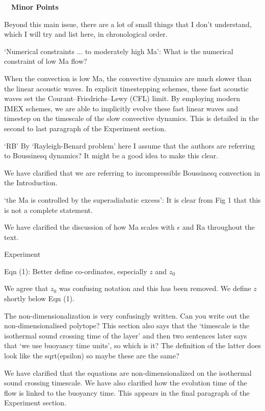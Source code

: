 \documentclass[aps, 11pt, singlecolumn]{revtex4-1} %
\begin{document}
\begin{singlespace}
$\,$
\newline
$\,$
\newline
\indent
\large{\textbf{Minor Points}}\newline
\begin{myquotation}
Beyond this main issue, there are a lot of small things that I don't
understand, which I will try and list here, in chronological order.

`Numerical constraints ... to moderately high Ma': What is the
numerical constraint of low Ma flow?
\end{myquotation}
When the convection is low Ma, the convective dynamics are much slower
than the linear acoustic waves.  In explicit timestepping schemes, these
fast acoustic waves set the Courant–Friedrichs–Lewy (CFL) limit.
By employing modern IMEX schemes, we are able to implicitly evolve these
fast linear waves and timestep on the timescale of the slow convective
dynamics.    This is detailed in the second to
last paragraph of the Experiment section.

\begin{myquotation}
`RB' By `Rayleigh-Benard problem' here I assume that the
authors are referring to Boussinesq dynamics? It might be a good idea
to make this clear.
\end{myquotation}
We have clarified that we are referring to incompressible Boussinesq convection
in the Introduction.

\begin{myquotation}
`the Ma is controlled by the superadiabatic excess': It is clear
from Fig 1 that this is not a complete statement.
\end{myquotation}
We have clarified the discussion of how Ma scales with $\epsilon$ and
Ra throughout the text.

\begin{myquotation}
Experiment

Eqn (1): Better define co-ordinates, especially $z$ and $z_0$
\end{myquotation}
We agree that $z_0$ was confusing notation and this has been removed.  
We define $z$ shortly below Eqn (1).

\begin{myquotation}
The non-dimensionalization is very confusingly written. Can you write
out the non-dimensionalised polytope? This section also says that the
`timescale is the isothermal sound crossing time of the layer'
and then two sentences later says that `we use buoyancy time
units', so which is it? The definition of the latter does look like
the sqrt(epsilon) so maybe these are the same?
\end{myquotation}
We have clarified that the equations are non-dimensionalized on
the isothermal sound crossing timescale.  We have also clarified
how the evolution time of the flow is linked to the buoyancy time.
This appears in the final paragraph of the Experiment section.


\end{singlespace}
\end{document}
